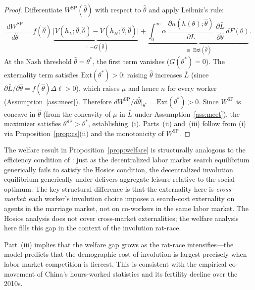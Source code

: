 \documentclass[12pt]{article}
\theoremstyle{plain}
\theoremstyle{definition}
\theoremstyle{remark}
\newcommand{\tstar}{\theta^{*}}
\newcommand{\tsp}{\theta^{\mathrm{SP}}}
\newcommand{\Lbar}{\bar{L}}
\newcommand{\hH}{h_{H}}
\newcommand{\hL}{h_{L}}
\begin{document}
\begin{proof}
Differentiate $W^{\mathrm{SP}}(\hat\theta)$ with respect to $\hat\theta$ and apply
Leibniz's rule:
\begin{equation}
  \frac{dW^{\mathrm{SP}}}{d\hat\theta}
  = f(\hat\theta)\,\underbrace{\bigl[V(\hL;\hat\theta,\hat\theta)
      - V(\hH;\hat\theta,\hat\theta)\bigr]}_{= -G(\hat\theta)}
  + \underbrace{\int_{0}^{\infty} \alpha\,
      \frac{\partial n(h(\theta);\hat\theta)}{\partial \Lbar}\,
      \frac{\partial \Lbar}{\partial\hat\theta}\,dF(\theta)}_{\equiv\; \mathrm{Ext}(\hat\theta)}.
  \label{eq:Wderiv}
\end{equation}
At the Nash threshold $\hat\theta = \tstar$, the first term vanishes
($G(\tstar) = 0$).  The externality term satisfies
$\mathrm{Ext}(\tstar) > 0$: raising $\hat\theta$ increases $\Lbar$ (since
$\partial\Lbar/\partial\hat\theta = f(\hat\theta)\Delta\ell > 0$), which raises
$\mu$ and hence $n$ for every worker (Assumption~\ref{ass:meet}).  Therefore
$dW^{\mathrm{SP}}/d\hat\theta\big|_{\tstar} = \mathrm{Ext}(\tstar) > 0$.  Since
$W^{\mathrm{SP}}$ is concave in $\hat\theta$ (from the concavity of $\mu$ in
$\Lbar$ under Assumption~\ref{ass:meet}), the maximizer satisfies $\tsp > \tstar$,
establishing~(i).  Parts~(ii) and~(iii) follow from (i) via
Proposition~\ref{prop:cs}(ii) and the monotonicity of $W^{\mathrm{SP}}$.
\end{proof}

The welfare result in Proposition~\ref{prop:welfare} is structurally analogous to
the efficiency condition of \citet{Hosios1990}: just as the decentralized labor
market search equilibrium generically fails to satisfy the Hosios condition,
the decentralized involution equilibrium generically under-delivers aggregate leisure
relative to the social optimum.  The key structural difference is that the externality
here is \emph{cross-market}: each worker's involution choice imposes a search-cost
externality on agents in the marriage market, not on co-workers in the same labor
market.  The Hosios analysis does not cover cross-market externalities; the welfare
analysis here fills this gap in the context of the involution rat-race.

Part~(iii) implies that the welfare gap grows as the rat-race intensifies---the model
predicts that the demographic cost of involution is largest precisely when labor market
competition is fiercest.  This is consistent with the empirical co-movement of
China's hours-worked statistics and its fertility decline over the 2010s.
\end{document}
